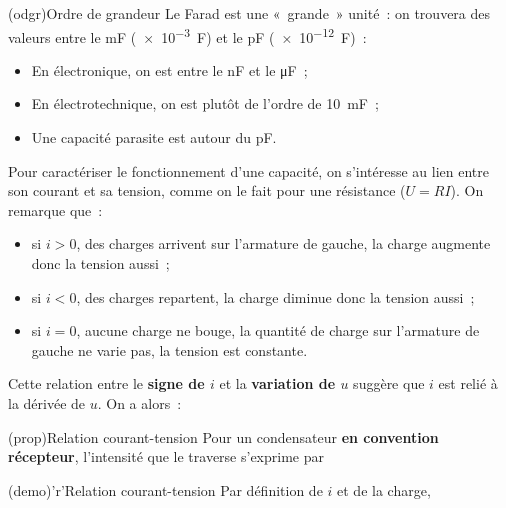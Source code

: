 \documentclass[../../main/main.tex]{subfiles}
\begin{document}
\begin{tcb*}(odgr){Ordre de grandeur}
	Le Farad est une «~grande~» unité~: on trouvera des valeurs entre le \si{mF}
	(\SI{e-3}{F}) et le \si{pF} (\SI{e-12}{F})~:
	\begin{itemize}
		\item En électronique, on est entre le \si{nF} et le \si{\micro F}~;
		\item En électrotechnique, on est plutôt de l'ordre de \SI{10}{mF}~;
		\item Une capacité parasite est autour du \si{pF}.
	\end{itemize}
\end{tcb*}

Pour caractériser le fonctionnement d'une capacité, on s'intéresse au lien entre
son courant et sa tension, comme on le fait pour une résistance ($U = RI$). On
remarque que~:
\begin{itemize}
	\item si $i > 0$, des charges arrivent sur l'armature de gauche, la charge
	      augmente donc la tension aussi~;
	\item si $i < 0$, des charges repartent, la charge diminue donc la tension
	      aussi~;
	\item si $i = 0$, aucune charge ne bouge, la quantité de charge sur
	      l'armature de gauche ne varie pas, la tension est constante.
\end{itemize}

Cette relation entre le \textbf{signe de $i$} et la \textbf{variation de $u$}
suggère que $i$ est relié à la dérivée de $u$. On a alors~:

\begin{tcbraster}[raster columns=2, raster equal height=rows]
	\begin{tcb*}[label=prop:Ccarac](prop){Relation courant-tension}
		Pour un condensateur \textbf{en convention récepteur}, l'intensité que
		le traverse s'exprime par
		\psw{%
			\[\boxed{i = C \dv{u_C}{t}}\]
		}%
		\vspace{-15pt}
	\end{tcb*}
	\begin{tcb*}[label=demo:Ccarac](demo)'r'{Relation courant-tension}
		Par définition de $i$ et de la charge,
		\vspace{-15pt}
	\end{tcb*}
\end{tcbraster}
\end{document}
